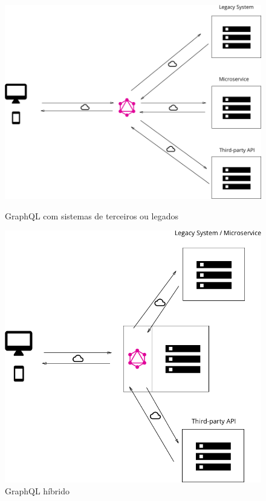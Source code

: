 \begin{figure}[h]
    \begin{minipage}{.5\textwidth}
        \includegraphics[scale=0.2]{img/gql-3th-legacy.png}
        \caption{GraphQL com sistemas de terceiros ou legados}
        \label{fig:gql-3th-legacy}
    \end{minipage}
    \begin{minipage}{.5\textwidth}
        \includegraphics[scale=0.25]{img/gql-hybrid.png}
        \caption{GraphQL híbrido}
        \label{fig:gql-hybrid}
    \end{minipage}
\end{figure}

